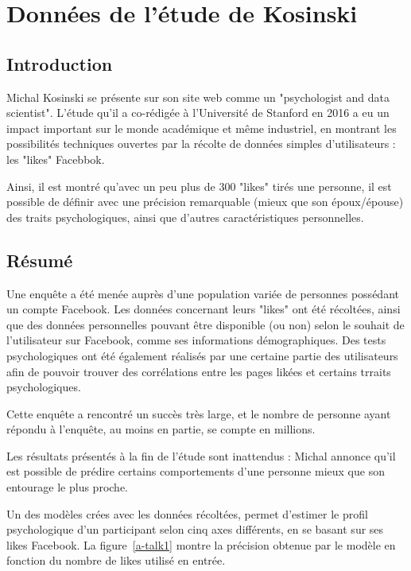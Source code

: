 
\section{Données de l'étude de Kosinski}

	\subsection{Introduction}

		Michal Kosinski se présente sur son site web\cite{michal-kosinski} comme un "psychologist and data scientist". L'étude qu'il a co-rédigée à l'Université de Stanford en 2016 a eu un impact important sur le monde académique et même industriel, en montrant les possibilités techniques ouvertes par la récolte de données simples d'utilisateurs : les "likes" Facebbok.

		Ainsi, il est montré qu'avec un peu plus de 300 "likes" tirés une personne, il est possible de définir avec une précision remarquable (mieux que son époux/épouse) des traits psychologiques, ainsi que d'autres caractéristiques personnelles.

	\subsection{Résumé}

		Une enquête a été menée auprès d'une population variée de personnes possédant un compte Facebook. Les données concernant leurs "likes" ont été récoltées, ainsi que des données personnelles pouvant être disponible (ou non) selon le souhait de l'utilisateur sur Facebook, comme ses informations démographiques. Des tests psychologiques ont été également réalisés par une certaine partie des utilisateurs afin de pouvoir trouver des corrélations entre les pages likées et certains trraits psychologiques.

		Cette enquête a rencontré un succès très large, et le nombre de personne ayant répondu à l'enquête, au moins en partie, se compte en millions.

		Les résultats présentés à la fin de l'étude sont inattendus : Michal annonce qu'il est possible de prédire certains comportements d'une personne mieux que son entourage le plus proche.

		Un des modèles crées avec les données récoltées, permet d'estimer le profil psychologique d'un participant selon cinq axes différents, en se basant sur ses likes Facebook. La figure~\ref{a-talk1} montre la précision obtenue par le modèle en fonction du nombre de likes utilisé en entrée.

